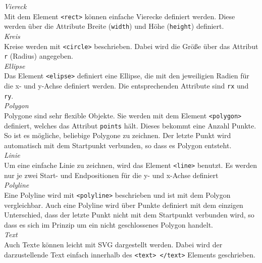 \emph{Viereck}\\
Mit dem Element \texttt{<rect>} können einfache Vierecke definiert werden. Diese werden über die Attribute Breite (\texttt{width}) und Höhe (\texttt{height}) definiert.\\

\emph{Kreis}\\
Kreise werden mit \texttt{<circle>} beschrieben. Dabei wird die Größe über das Attribut \texttt{r} (Radius) angegeben.\\

\emph{Ellipse}\\
Das Element \texttt{<elipse>} definiert eine Ellipse, die mit den jeweiligien Radien für die x- und y-Achse definiert werden. Die entsprechenden Attribute sind \texttt{rx} und \texttt{ry}.\\

\emph{Polygon}\\
Polygone sind sehr flexible Objekte. Sie werden mit dem Element \texttt{<polygon>} definiert, welches das Attribut \texttt{points} hält. Dieses bekommt eine Anzahl Punkte. So ist es mögliche, beliebige Polygone zu zeichnen. Der letzte Punkt wird automatisch mit dem Startpunkt verbunden, so dass es Polygon entsteht.\\

\emph{Linie}\\
Um eine einfache Linie zu zeichnen, wird das Element \texttt{<line>} benutzt. Es werden nur je zwei Start- und Endpositionen für die y- und x-Achse definiert\\

\emph{Polyline}\\
Eine Polyline wird mit \texttt{<polyline>} beschrieben und ist mit dem Polygon vergleichbar. Auch eine Polyline wird über Punkte definiert mit dem einzigen Unterschied, dass der letzte Punkt nicht mit dem Startpunkt verbunden wird, so dass es sich im Prinzip um ein nicht geschlossenes Polygon handelt.\\

\emph{Text}\\
Auch Texte können leicht mit SVG dargestellt werden. Dabei wird der darzustellende Text einfach innerhalb des \texttt{<text> </text>} Elements geschrieben.

\newpage
